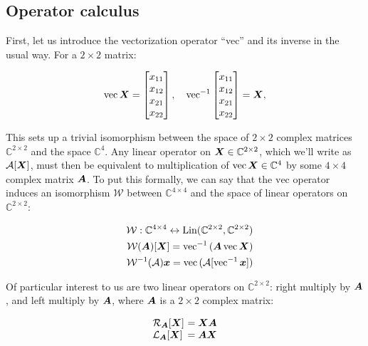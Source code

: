\documentclass[useAMS,usenatbib]{mn2e}
\newcommand{\COMPLEX}{\mathbb{C}}
\newcommand{\mat}[1]{{\bmath{#1}}}
\begin{document}
\subsection{Operator calculus}

First, let us introduce the vectorization operator ``vec'' and its inverse in the usual way. For a $2\times2$ matrix:

\newcommand{\VEC}[1]{\mathrm{vec}\,{#1}}
\newcommand{\VECINV}[1]{\mathrm{vec}^{-1}\,{#1}}

\[
\VEC{\mat{X}} = \Matrix{c}{x_{11}\\x_{12}\\x_{21}\\x_{22}},~~~
\VECINV{\Matrix{c}{x_{11}\\x_{12}\\x_{21}\\x_{22}}} = \mat{X},
\]

This sets up a trivial isomorphism between the space of $2\times2$ complex matrices $\COMPLEX^{2\times2}$ and the space 
$\COMPLEX^4$. Any linear operator on $\mat{X} \in \COMPLEX^{2\times2}$, which we'll write as $\mathcal{A}[\mat{X}]$, 
must then be equivalent to  multiplication of $\VEC{\mat{X}} \in \COMPLEX^4$ by some $4\times 4$ complex matrix $\mat A$. To put this formally, we can say that the $\mathrm{vec}$ operator induces an isomorphism  $\mathcal{W}$ 
between $\COMPLEX^{4\times4}$ and the space of linear 
operators on $\COMPLEX^{2\times2}$:

\begin{eqnarray}
&& \mathcal{W}:\COMPLEX^{4\times4}\leftrightarrow\mathrm{Lin}(\COMPLEX^{2\times2},\COMPLEX^{2\times2}) \nonumber\\
&& \mathcal{W}(\mat{A})[\mat{X}] = \VECINV{(\mat{A}\,\VEC{\mat{X}})} \nonumber \\
&& \mathcal{W}^{-1}(\mathcal{A})\bmath{x} = \VEC{(\mathcal{A}[ \VECINV{\bmath{x}} ])} \label{eq:iso:W}
\end{eqnarray}

Of particular interest to us are two linear operators on $\COMPLEX^{2\times2}$: right multiply by $\mat{A}$, and left multiply by $\mat{A}$, where $\mat{A}$ is a $2\times2$ complex matrix:

\[
\begin{array}{l@{~}l}
\Rop{\mat{A}}[\mat{X}] &= \mat{XA} \\
\Lop{\mat{A}}[\mat{X}] &= \mat{AX} \\
\end{array}
\]
\end{document}
